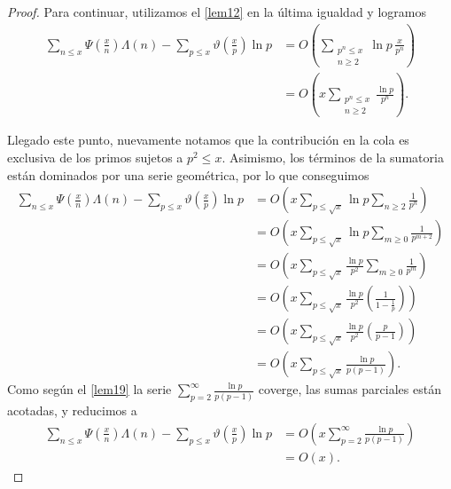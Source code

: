 \documentclass[10pt]{article}
\theoremstyle{definition}
\theoremstyle{remark}
\begin{document}
\begin{proof}
Para continuar, utilizamos el \cref{lem12} en la \'ultima igualdad y logramos 
\begin{align}
\sum_{n \leq x} \Psi\left(\frac{x}{n}\right)\Lambda(n) - \sum_{p \leq x} \vartheta\left(\frac{x}{p}\right)\ln p
&= O\left(\sum_{\substack{p^n \leq x \\ n \geq 2}} \ln p \, \frac{x}{p^n}\right) \\
&= O\left(x\sum_{\substack{p^n \leq x \\ n \geq 2}} \frac{\ln p}{p^n}\right).
\end{align}

Llegado este punto, nuevamente notamos que la contribuci\'on en la cola es exclusiva de los primos sujetos a $p^2 \le x$. 
Asimismo, los t\'erminos de la sumatoria est\'an dominados por una serie geom\'etrica, 
por lo que conseguimos 
\begin{align}
\sum_{n \leq x} \Psi\left(\frac{x}{n}\right)\Lambda(n) - \sum_{p \leq x} \vartheta\left(\frac{x}{p}\right)\ln p
&= O\left(x \sum_{p \leq \sqrt{x}} \ln p \sum_{n \geq 2} \frac{1}{p^n}\right) \\
%
&= O\left(x \sum_{p \leq \sqrt{x}} \ln p \sum_{m \geq 0} \frac{1}{p^{m + 2}}\right) \\
&= O\left(x \sum_{p \leq \sqrt{x}} \frac{\ln p}{p^2} \sum_{m \geq 0} \frac{1}{p^m}\right) \\
&= O\left(x \sum_{p \leq \sqrt{x}} \frac{\ln p}{p^2} \left(\frac{1}{1 - \frac{1}{p}}\right)\right) \\
&= O\left(x \sum_{p \leq \sqrt{x}} \frac{\ln p}{p^2} \left(\frac{p}{p - 1}\right)\right) \\
&= O\left(x \sum_{p \leq \sqrt{x}} \frac{\ln p}{p (p - 1)}\right).
\end{align}
Como seg\'un el \cref{lem19} la serie $\displaystyle{\sum_{p = 2}^{\infty} \frac{\ln p}{p (p - 1)}}$ coverge, 
las sumas parciales est\'an acotadas, y reducimos a 
\begin{align}
\sum_{n \leq x} \Psi\left(\frac{x}{n}\right)\Lambda(n) - \sum_{p \leq x} \vartheta\left(\frac{x}{p}\right)\ln p
&= O\left(x \sum_{p = 2}^\infty \frac{\ln p}{p (p - 1)}\right) \\
&= O(x).
\end{align}


\end{proof}
\end{document}
